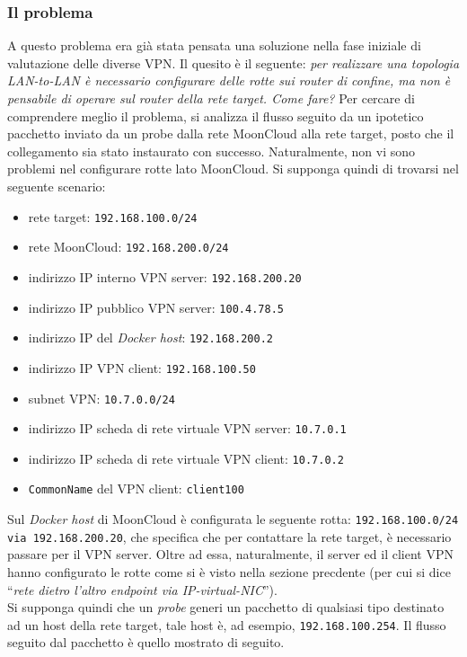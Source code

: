\subsubsection{Il problema}
A questo problema era già stata pensata una soluzione nella fase iniziale di valutazione
delle diverse VPN. Il quesito è il seguente: \textit{per realizzare una topologia
LAN-to-LAN è necessario configurare delle rotte sui router di confine, ma non è
pensabile di operare sul router della rete target. Come fare?}
Per cercare di comprendere meglio il problema, si analizza il flusso seguito
da un ipotetico pacchetto inviato da un probe dalla rete MoonCloud alla rete target,
posto che il collegamento sia stato instaurato con successo. Naturalmente, non vi sono
problemi nel configurare rotte lato MoonCloud. Si supponga quindi di trovarsi nel
seguente scenario:
\begin{itemize}
  \item rete target: \texttt{192.168.100.0/24}
  \item rete MoonCloud: \texttt{192.168.200.0/24}
  \item indirizzo IP interno VPN server: \texttt{192.168.200.20}
  \item indirizzo IP pubblico VPN server: \texttt{100.4.78.5}
  \item indirizzo IP del \textit{Docker host}: \texttt{192.168.200.2}
  \item indirizzo IP VPN client: \texttt{192.168.100.50}
  \item subnet VPN: \texttt{10.7.0.0/24}
  \item indirizzo IP scheda di rete virtuale VPN server: \texttt{10.7.0.1}
  \item indirizzo IP scheda di rete virtuale VPN client: \texttt{10.7.0.2}
  \item \texttt{CommonName} del VPN client: \texttt{client100}
\end{itemize}
Sul \textit{Docker host} di MoonCloud è configurata le seguente rotta:
\texttt{192.168.100.0/24 via 192.168.200.20}, che specifica che per contattare la rete target,
è necessario passare per il VPN server. Oltre ad essa, naturalmente, il server ed il
client VPN hanno configurato le rotte come si è visto nella sezione precdente
(per cui si dice ``\textit{rete dietro l'altro endpoint via IP-virtual-NIC}'').\\
Si supponga quindi che un \textit{probe}  generi un pacchetto di qualsiasi tipo destinato
ad un host della rete target, tale host è, ad esempio, \texttt{192.168.100.254}.
Il flusso seguito dal pacchetto è quello mostrato di seguito.
